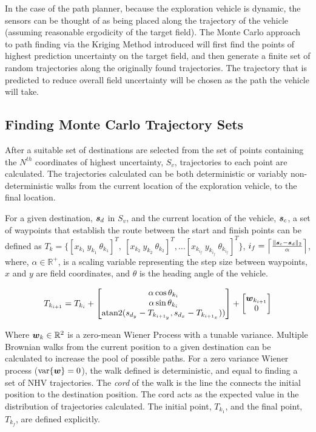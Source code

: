 In the case of the path planner, because the exploration vehicle is dynamic, the sensors can be thought of as being placed along the trajectory of the vehicle (assuming reasonable ergodicity of the target field). The Monte Carlo approach to path finding via the Kriging Method introduced will first find the points of highest prediction uncertainty on the target field, and then generate a finite set of random trajectories along the originally found trajectories. The trajectory that is predicted to reduce overall field uncertainty will be chosen as the path the vehicle will take.

\subsection{Finding Monte Carlo Trajectory Sets} \label{sec:mctrajsets}
After a suitable set of destinations are selected from the set of points containing the $N^{th}$ coordinates of highest uncertainty, $S_{v}$, trajectories to each point are calculated. The trajectories calculated can be both deterministic or variably non-deterministic walks from the current location of the exploration vehicle, to the final location.

For a given destination, ${\it{\boldsymbol{s}}}_d$ in $S_{v}$, and the current location of the vehicle, ${\it{\boldsymbol{s}}}_{c}$, a set of waypoints that establish the route between the start and finish points can be defined as $T_k = \Big\{[x_{k_1}\ y_{k_1}\ \theta_{k_1}]^T,\ [x_{k_2}\ y_{k_2}\ \theta_{k_2}]^T, \dots [x_{k_{i_f}}\ y_{k_{i_f}}\ \theta_{k_{i_f}}]^T \Big\}$, $i_f = \Big\lceil \frac{\|{\it{\boldsymbol{s}}}_c - {\it{\boldsymbol{s}}}_d\|_2}{\alpha} \Big\rceil$, where, $\alpha \in \mathbb{R}^{+}$, is a scaling variable representing the step size between waypoints, $x$ and $y$ are field coordinates, and $\theta$ is the heading angle of the vehicle. 

\begin{equation}
	T_{k_{i + 1}} = T_{k_i} +
	\begin{bmatrix}
		\alpha \cos \theta_{k_i} \\
		\alpha \sin \theta_{k_i} \\
		\text{atan2}(s_{d_y} - T_{k_{{i+1}_y}}, s_{d_x} - T_{k_{{i+1}_x}}))
	\end{bmatrix} + \begin{bmatrix} 
		{\it{\boldsymbol{w}}}_{k_{i+1}} \\
		0
	\end{bmatrix}
\end{equation}

Where ${\it{\boldsymbol{w}}}_k \in \mathbb{R}^2$ is a zero-mean Wiener Process with a tunable variance. Multiple Brownian walks from the current position to a given destination can be calculated to increase the pool of possible paths. For a zero variance Wiener process ($\text{var}\{{\it{\boldsymbol{w}}}\}=0$), the walk defined is deterministic, and equal to finding a set of NHV trajectories. The \textit{cord} of the walk is the line the connects the initial position to the destination position. The cord acts as the expected value in the distribution of trajectories calculated. The initial point, $T_{k_1}$, and the final point, $T_{k_f}$, are defined explicitly.

